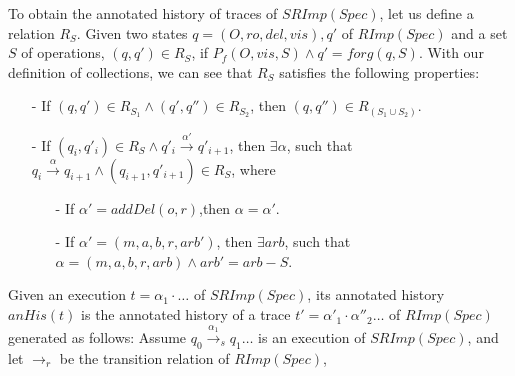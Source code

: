 To obtain the annotated history of traces of $SRImp(Spec)$, let us define a relation $R_S$. Given two states $q=(O,\mathit{ro},\mathit{del},\mathit{vis}),q'$ of $RImp(Spec)$ and a set $S$ of operations, $(q,q') \in R_S$, if $P_f(O,\mathit{vis},S) \wedge q' = forg(q,S)$. With our definition of collections, we can see that $R_S$ satisfies the following properties:

\begin{itemize}
\setlength{\itemsep}{0.5pt}
\item[-] If $(q,q') \in R_{ S_1 } \wedge (q',q'') \in R_{ S_2 }$, then $(q,q'') \in R_{ ( S_1 \cup S_2 ) }$.

\item[-] If $(q_i,q'_i) \in R_{S} \wedge q'_i {\xrightarrow{\alpha'}} q'_{i+1}$, then $\exists \alpha$, such that $q_i {\xrightarrow{\alpha}} q_{i+1} \wedge (q_{i+1},q'_{i+1}) \in R_{S}$, where

    \begin{itemize}
    \setlength{\itemsep}{0.5pt}
    \item[-] If $\alpha' = addDel(o,r)$,then $\alpha = \alpha'$.

    \item[-] If $\alpha'=(m,a,b,r,\mathit{arb}')$, then $\exists \mathit{arb}$, such that $\alpha=(m,a,b,r,\mathit{arb}) \wedge \mathit{arb}' = \mathit{arb} - S$.
    \end{itemize}
\end{itemize}


Given an execution $t = \alpha_1 \cdot \ldots$ of $SRImp(Spec)$, its annotated history $anHis(t)$ is the annotated history of a trace $t' = \alpha'_1 \cdot \alpha''_2 \ldots$ of $RImp(Spec)$ generated as follows: Assume $q_0 {\xrightarrow{\alpha_1}}_s q_1 \ldots$ is an execution of $SRImp(Spec)$, and let $\rightarrow_r$ be the transition relation of $RImp(Spec)$,

